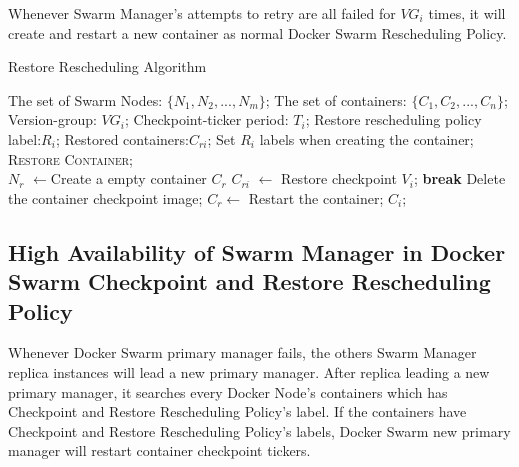 Whenever Swarm Manager's attempts to retry are all failed for $ VG_i $ times, it will create and restart a new container as normal Docker Swarm Rescheduling Policy.

\begin{algorithm}[hbtp]
    \caption{Restore Rescheduling Algorithm}
    \label{code:Restore}
    \begin{algorithmic}[1]
    	\Require
		The set of Swarm Nodes: $ \lbrace N_1,N_2,...,N_m \rbrace $;
		The set of containers: $ \lbrace C_1,C_2,...,C_n \rbrace $;
		Version-group: $ VG_i $;
		Checkpoint-ticker period: $ T_i $;
		Restore rescheduling policy label:$ R_i $;
	\Ensure
		Restored containers:$ C_{ri} $;
        \State Set $ R_i $ labels when creating the container;
        \\
        		\State \textsc{Restore Container};
        	\EndFor
        \EndIf
        \\
			\State $ N_r $ $\longleftarrow$Create a empty container $ C_r $
				\State $ C_{ri} $ $\longleftarrow$ Restore checkpoint $ V_i $;
					\State \textbf{break}
				\EndIf
			\EndFor
			\State Delete the container checkpoint image;
				\State $ C_r \longleftarrow $ Restart the container; $C_i$;
			\EndIf
		\EndProcedure
	\end{algorithmic}
\end{algorithm}

\subsection{High Availability of Swarm Manager in Docker Swarm Checkpoint and Restore Rescheduling Policy}
Whenever Docker Swarm primary manager fails, the others Swarm Manager replica instances will lead a new primary manager.
After replica leading a new primary manager, it searches every Docker Node's containers which has Checkpoint and Restore Rescheduling Policy's label.
If the containers have Checkpoint and Restore Rescheduling Policy's labels, Docker Swarm new primary manager will restart container checkpoint tickers.